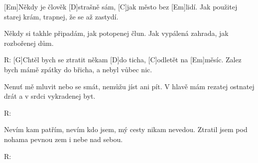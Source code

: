 
[Em]Někdy je člověk [D]strašně sám,
[C]jak město bez [Em]lidí.
Jak použitej starej krám,
trapnej, že se až zastydí.

Někdy si takhle připadám,
jak potopenej člun.
Jak vypálená zahrada,
jak rozbořenej dům.

R: [G]Chtěl bych se ztratit někam [D]do ticha,
[C]odletět na [Em]měsíc.
Zalez bych mámě zpátky do břicha,
a nebyl vůbec nic.

Nenuť mě mluvit nebo se smát,
nemůžu jíst ani pít.
V hlavě mám rezatej ostnatej drát
a v srdci vykradenej byt.

R:

Nevím kam patřím, nevím kdo jsem,
mý cesty nikam nevedou.
Ztratil jsem pod nohama pevnou zem
i nebe nad sebou.

R:
